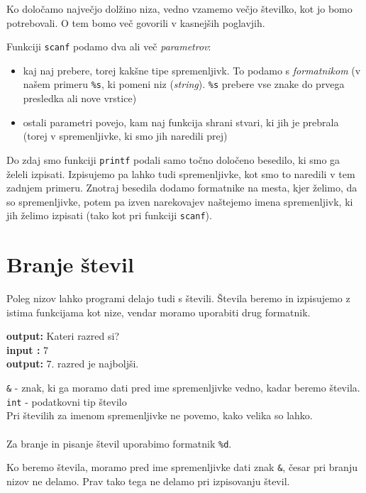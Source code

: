 \begin{errors} %
Ko določamo največjo dolžino niza, vedno vzamemo večjo številko, kot jo bomo potrebovali. O tem bomo več govorili v kasnejših poglavjih.
\end{errors}


Funkciji \verb+scanf+ podamo dva ali več \emph{parametrov}:
\begin{itemize}
	\item kaj naj prebere, torej kakšne tipe spremenljivk. To podamo s \emph{formatnikom} (v našem primeru \verb+%s+, ki pomeni niz (\emph{string}). \verb+%s+ prebere vse znake do prvega presledka ali nove vrstice)
	\item ostali parametri povejo, kam naj funkcija shrani stvari, ki jih je prebrala (torej v spremenljivke, ki smo jih naredili prej)
\end{itemize}


Do zdaj smo funkciji \verb+printf+ podali samo točno določeno besedilo, ki smo ga želeli izpisati. Izpisujemo pa lahko tudi spremenljivke, kot smo to naredili v tem zadnjem primeru. Znotraj besedila dodamo formatnike na mesta, kjer želimo, da so spremenljivke, potem pa izven narekovajev naštejemo imena spremenljivk, ki jih želimo izpisati (tako kot pri funkciji \verb+scanf+).

\pagebreak
\section{Branje števil}
Poleg nizov lahko programi delajo tudi s števili. Števila beremo in izpisujemo z istima funkcijama kot nize, vendar moramo uporabiti drug formatnik.

\begin{examples}


\begin{inout}
{\color{blue} \bf output:} Kateri razred si?\\
{\color{blue} \bf input :} 7\\
{\color{blue} \bf output:} 7. razred je najboljši.
\end{inout}

\end{examples}

\verb+&+ - znak, ki ga moramo dati pred ime spremenljivke vedno, kadar beremo števila.
\verb+int+ - podatkovni tip število \\
Pri številih za imenom spremenljivke ne povemo, kako velika so lahko. \\\\
Za branje in pisanje števil uporabimo formatnik \verb+%d+.

\begin{errors}
Ko beremo števila, moramo pred ime spremenljivke dati znak \verb+&+, česar pri branju nizov ne delamo. Prav tako tega ne delamo pri izpisovanju števil.
\end{errors}
